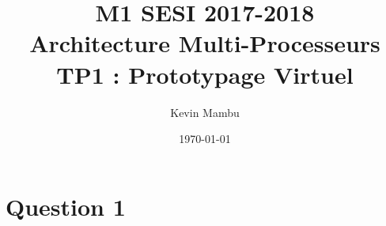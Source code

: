 \documentclass[10pt]{article}
\author{Kevin Mambu}
\date{\today}
\title{M1 SESI 2017-2018\\Architecture Multi-Processeurs\\TP1 : Prototypage Virtuel}
\begin{document}
\maketitle

\newpage

\section{Question 1}
\end{document}
